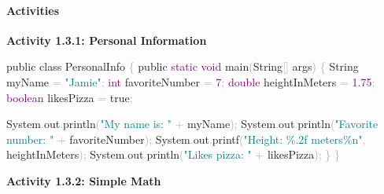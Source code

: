 \documentclass[
  justified,
  openright,
]{tufte-book}
\let\subsubsection\paragraph
\let\paragraph\paragraph
\newcommand{\BuiltInTok}[1]{#1}
\newcommand{\DataTypeTok}[1]{\textcolor{Purple}{#1}}
\newcommand{\DecValTok}[1]{\textcolor{Purple}{#1}}
\newcommand{\FloatTok}[1]{\textcolor{Purple}{#1}}
\newcommand{\FunctionTok}[1]{\textcolor{BrandBlue}{#1}}
\newcommand{\KeywordTok}[1]{\textcolor{BrandBlue}{#1}}
\newcommand{\NormalTok}[1]{#1}
\newcommand{\OperatorTok}[1]{\textcolor{DarkGray}{#1}}
\newcommand{\SpecialCharTok}[1]{\textcolor{Teal}{#1}}
\newcommand{\StringTok}[1]{\textcolor{Teal}{#1}}
\newenvironment{Shaded}{%
  \begin{snugshade}
}{%
  \end{snugshade}
}
\let\subsubsection\paragraph
\let\paragraph\paragraph
\begin{document}
\subsubsection{Activities}\label{activities}

\textbf{Activity 1.3.1: Personal Information}

\begin{Shaded}
\begin{Highlighting}[]
\KeywordTok{public} \KeywordTok{class}\NormalTok{ PersonalInfo }\OperatorTok{\{}
    \KeywordTok{public} \DataTypeTok{static} \DataTypeTok{void} \FunctionTok{main}\OperatorTok{(}\BuiltInTok{String}\OperatorTok{[]}\NormalTok{ args}\OperatorTok{)} \OperatorTok{\{}
        \BuiltInTok{String}\NormalTok{ myName }\OperatorTok{=} \StringTok{"Jamie"}\OperatorTok{;}
        \DataTypeTok{int}\NormalTok{ favoriteNumber }\OperatorTok{=} \DecValTok{7}\OperatorTok{;}
        \DataTypeTok{double}\NormalTok{ heightInMeters }\OperatorTok{=} \FloatTok{1.75}\OperatorTok{;}
        \DataTypeTok{boolean}\NormalTok{ likesPizza }\OperatorTok{=} \KeywordTok{true}\OperatorTok{;}

        \BuiltInTok{System}\OperatorTok{.}\FunctionTok{out}\OperatorTok{.}\FunctionTok{println}\OperatorTok{(}\StringTok{"My name is: "} \OperatorTok{+}\NormalTok{ myName}\OperatorTok{);}
        \BuiltInTok{System}\OperatorTok{.}\FunctionTok{out}\OperatorTok{.}\FunctionTok{println}\OperatorTok{(}\StringTok{"Favorite number: "} \OperatorTok{+}\NormalTok{ favoriteNumber}\OperatorTok{);}
        \BuiltInTok{System}\OperatorTok{.}\FunctionTok{out}\OperatorTok{.}\FunctionTok{printf}\OperatorTok{(}\StringTok{"Height: }\SpecialCharTok{\%.2f}\StringTok{ meters}\SpecialCharTok{\%n}\StringTok{"}\OperatorTok{,}\NormalTok{ heightInMeters}\OperatorTok{);}
        \BuiltInTok{System}\OperatorTok{.}\FunctionTok{out}\OperatorTok{.}\FunctionTok{println}\OperatorTok{(}\StringTok{"Likes pizza: "} \OperatorTok{+}\NormalTok{ likesPizza}\OperatorTok{);}
    \OperatorTok{\}}
\OperatorTok{\}}
\end{Highlighting}
\end{Shaded}

\textbf{Activity 1.3.2: Simple Math}
\end{document}
